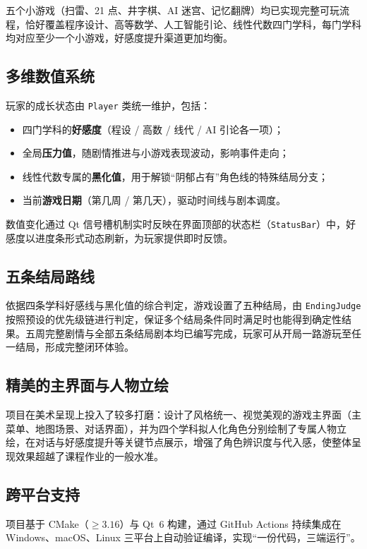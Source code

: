 \documentclass[12pt]{article}
\newcommand{\module}[1]{\texttt{#1}}
\begin{document}
五个小游戏（扫雷、21 点、井字棋、AI 迷宫、记忆翻牌）均已实现完整可玩流程，恰好覆盖程序设计、高等数学、人工智能引论、线性代数四门学科，每门学科均对应至少一个小游戏，好感度提升渠道更加均衡。

\subsection{多维数值系统}
玩家的成长状态由 \module{Player} 类统一维护，包括：

\begin{itemize}[itemsep=2pt]
  \item 四门学科的\textbf{好感度}（程设 / 高数 / 线代 / AI 引论各一项）；
  \item 全局\textbf{压力值}，随剧情推进与小游戏表现波动，影响事件走向；
  \item 线性代数专属的\textbf{黑化值}，用于解锁“阴郁占有”角色线的特殊结局分支；
  \item 当前\textbf{游戏日期}（第几周 / 第几天），驱动时间线与剧本调度。
\end{itemize}

数值变化通过 Qt 信号槽机制实时反映在界面顶部的状态栏（\module{StatusBar}）中，好感度以进度条形式动态刷新，为玩家提供即时反馈。

\subsection{五条结局路线}
依据四条学科好感线与黑化值的综合判定，游戏设置了五种结局，由 \module{EndingJudge} 按照预设的优先级链进行判定，保证多个结局条件同时满足时也能得到确定性结果。五周完整剧情与全部五条结局剧本均已编写完成，玩家可从开局一路游玩至任一结局，形成完整闭环体验。

\subsection{精美的主界面与人物立绘}
项目在美术呈现上投入了较多打磨：设计了风格统一、视觉美观的游戏主界面（主菜单、地图场景、对话界面），并为四个学科拟人化角色分别绘制了专属人物立绘，在对话与好感度提升等关键节点展示，增强了角色辨识度与代入感，使整体呈现效果超越了课程作业的一般水准。

\subsection{跨平台支持}
项目基于 CMake（$\geq 3.16$）与 Qt~6 构建，通过 GitHub Actions 持续集成在 Windows、macOS、Linux 三平台上自动验证编译，实现“一份代码，三端运行”。
\end{document}
